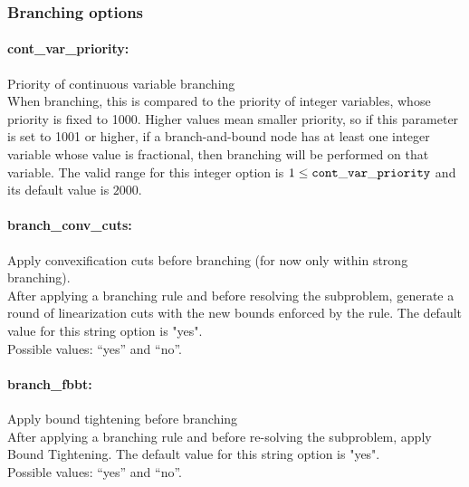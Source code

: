 \subsubsection{Branching options}

\paragraph{cont\_var\_priority:}\label{sec:cont_var_priority} Priority of continuous variable branching $\;$ \\
When branching, this is compared to the priority of integer variables, whose priority is fixed to 1000. Higher values mean smaller priority, so if this parameter is set to 1001 or higher, if a branch-and-bound node has at least one integer
variable whose value is fractional, then branching will be performed on that variable.
The valid range for this integer option is
$1 \le {\tt cont\_var\_priority }$ and its default value is $2000$.

\paragraph{branch\_conv\_cuts:}\label{sec:branch_conv_cuts} Apply convexification cuts before branching (for now only within strong branching). $\;$ \\
After applying a branching rule and before resolving the subproblem, generate a round of linearization cuts with the new bounds enforced by the rule.
The default value for this string option is "yes".
\\ 
Possible values: ``yes'' and ``no''.

\paragraph{branch\_fbbt:}\label{sec:branch_fbbt} Apply bound tightening before branching $\;$ \\
After applying a branching rule and before re-solving the subproblem, apply Bound Tightening.
The default value for this string option is "yes".
\\ 
Possible values: ``yes'' and ``no''.


